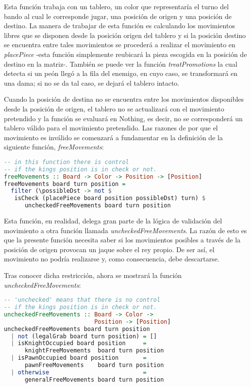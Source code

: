 \documentclass{llncs}
\begin{document}
Esta función trabaja con un tablero, un color que representaría el turno del bando al cual le corresponde jugar, una posición de origen y una posición de destino. La manera de trabajar de esta función es calculando los movimientos libres que se disponen desde la posición origen del tablero y si la posición destino se encuentra entre tales movimientos se procederá a realizar el movimiento en \textit{placePiece} -esta función simplemente reubicará la pieza escogida en la posición de destino en la matriz-. También se puede ver la función \textit{treatPromotions} la cual detecta si un peón llegó a la fila del enemigo, en cuyo caso, se transformará en una dama; si no se da tal caso, se dejará el tablero intacto.

Cuando la posición de destina no se encuentra entre los movimientos disponibles desde la posición de origen, el tablero no se actualizará con el movimiento pretendido y la función se evaluará en Nothing, es decir, no se corresponderá un tablero válido para el movimiento pretendido. Las razones de por que el movimiento es inválido se comenzará a fundamentar en la definición de la siguiente función, \textit{freeMovements}:


\begin{lstlisting}[frame=single, language=haskell, captionpos=b, caption=Función freeMovements, label={lst:free_movements}]
-- in this function there is control
-- if the kings position is in check or not.
freeMovements :: Board -> Color -> Position -> [Position]
freeMovements board turn position =
  filter (\possibleDst -> not $
   isCheck (placePiece board position possibleDst) turn) $
      uncheckedFreeMovements board turn position
\end{lstlisting}

Esta función, en realidad, delega gran parte de la lógica de validación del movimiento a otra función llamada \textit{uncheckedFreeMovements}. La razón de esto es que la presente función necesita saber si los movimientos posibles a través de la posición de origen provocan un jaque sobre el rey propio. De ser así, el movimiento no podría realizarse y, como consecuencia, debe descartarse.

Tras conocer dicha restricción, ahora se mostrará la función \textit{uncheckedFreeMovements}:


\begin{lstlisting}[frame=single, language=haskell, captionpos=b, caption=Función uncheckedFreeMovements, label={lst:unchecked_free_movements}]
-- 'unchecked' means that there is no control
-- if the kings position is in check or not.
uncheckedFreeMovements :: Board -> Color ->
                          Position -> [Position]
uncheckedFreeMovements board turn position
  | not (legalGrab board turn position) = []
  | isKnightOccupied board position     =
      knightFreeMovements  board turn position
  | isPawnOccupied board position       =
      pawnFreeMovements    board turn position
  | otherwise                           =
      generalFreeMovements board turn position
\end{lstlisting}
\end{document}
